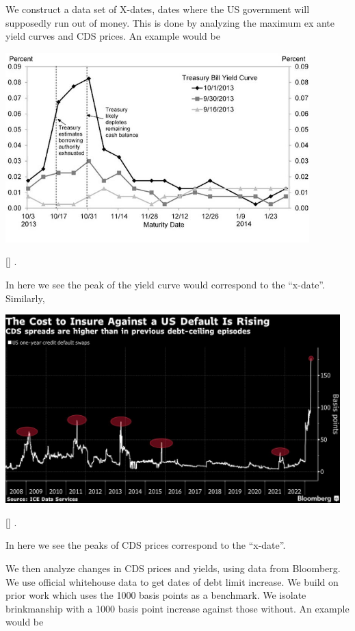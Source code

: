 \documentclass[
  12pt]{article}
\begin{document}
We construct a data set of X-dates, dates where the US government will
supposedly run out of money. This is done by analyzing the maximum ex
ante yield curves and CDS prices. An example would be

\includegraphics[width=4.625in,height=\textheight]{style-guide/x-date-estmation.jpg}

{[}\citet{boesler}{]}\citep{steinmetz-silber} .

In here we see the peak of the yield curve would correspond to the
``x-date''. Similarly,

\includegraphics[width=5.09375in,height=\textheight]{style-guide/CDS-x-date.png}

{[}\citet{rao2023}{]}\citep{benzoni} .

In here we see the peaks of CDS prices correspond to the ``x-date''.

We then analyze changes in CDS prices and yields, using data from
Bloomberg. We use official whitehouse data to get dates of debt limit
increase. We build on prior work which uses the 1000 basis points as a
benchmark. We isolate brinkmanship with a 1000 basis point increase
against those without. An example would be
\end{document}
